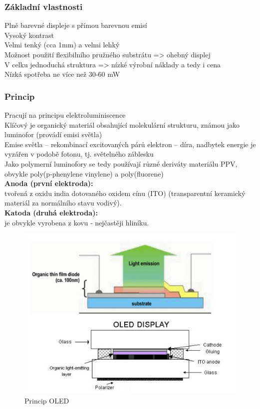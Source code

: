\subsubsection{Základní vlastnosti}
Plně barevné displeje s přímou barevnou emisí\\
Vysoký kontrast\\
Velmi tenký (cca 1mm) a velmi lehký\\
Možnost použití flexibilního pružného substrátu => ohebný displej\\
V celku jednoduchá struktura => nízké výrobní náklady a tedy i cena\\
Nízká spotřeba ne více než 30‐60 mW\\

\subsubsection{Princip}
Pracují na principu elektroluminiscence\\
Klíčový je organický materiál obsahující molekulární strukturu, známou
jako luminofor (provádí emisi světla)\\
Emise světla – rekombinací excitovaných párů elektron – díra, nadbytek
energie je vyzářen v podobě fotonu, tj. světelného záblesku\\
Jako polymerní luminofory se tedy používají různé deriváty materiálu
PPV, obvykle poly(p‐phenylene vinylene) a poly(fluorene)\\

\textbf{Anoda (první elektroda):}\\
tvořená z oxidu india dotovaného oxidem cínu (ITO) (transparentní keramický materiál za normálního stavu vodivý).\\
\textbf{Katoda (druhá elektroda):}\\
je obvykle vyrobena z kovu ‐ nejčastěji hliníku.\\

    \begin{figure}[h]
   \begin{center}
     \includegraphics[scale=0.4]{images/OLED.png}
   \end{center}
   \caption{Princip OLED}
  \end{figure}
